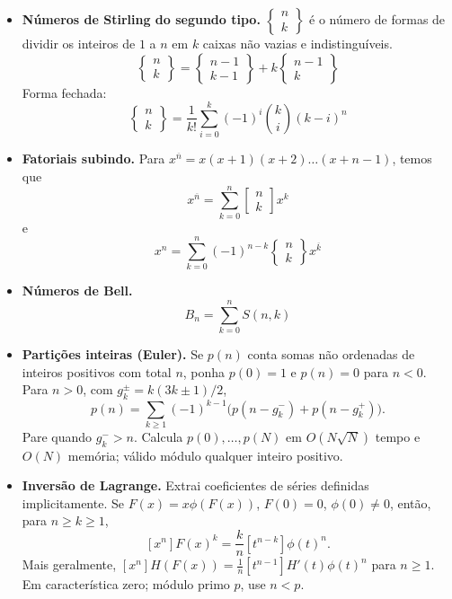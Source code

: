 \begin{itemize}[leftmargin=*,label={}]
	\item \textbf{Números de Stirling do segundo tipo.}
		$\begin{Bmatrix} n \\ k \end{Bmatrix}$ é o número de formas de dividir os inteiros de $1$ a $n$ em $k$ caixas não vazias e indistinguíveis.
		\[
			\begin{Bmatrix} n \\ k \end{Bmatrix} = \begin{Bmatrix} n-1 \\ k-1 \end{Bmatrix} + k \begin{Bmatrix} n-1 \\ k \end{Bmatrix}
		\]
		Forma fechada:
		\[
			\begin{Bmatrix} n \\ k \end{Bmatrix} = \frac1{k!}\sum_{i=0}^{k}(-1)^i\binom{k}{i}(k-i)^n
		\]

	\item \textbf{Fatoriais subindo.}
		Para $x^{\overline{n}} = x (x + 1) (x + 2) \dots (x + n - 1)$, temos que 
		\[
			x^{\overline{n}} = \sum\limits_{k = 0}^n \begin{bmatrix} n \\ k \end{bmatrix} x^k
		\]
		e
		\[
			x^n = \sum\limits_{k = 0}^n (-1)^{n - k} \begin{Bmatrix} n \\ k \end{Bmatrix} x^{\overline{k}}
		\]

	\ifextended
	\item \textbf{Números de Bell.}
		\[
			B_n=\sum_{k=0}^{n}S(n,k)
		\]
	\fi

\item \textbf{Partições inteiras (Euler).}
Se $p(n)$ conta somas não ordenadas de inteiros positivos com total $n$, ponha $p(0)=1$ e $p(n)=0$ para $n<0$. Para $n>0$, com $g_k^{\pm}=k(3k\pm1)/2$,
\[
p(n)=\sum_{k\ge1}(-1)^{k-1}\bigl(p(n-g_k^-)+p(n-g_k^+)\bigr).
\]
Pare quando $g_k^->n$. Calcula $p(0),\ldots,p(N)$ em $O(N\sqrt N)$ tempo e $O(N)$ memória; válido módulo qualquer inteiro positivo.

\item \textbf{Inversão de Lagrange.}
Extrai coeficientes de séries definidas implicitamente. Se $F(x)=x\phi(F(x))$, $F(0)=0$, $\phi(0)\ne0$, então, para $n\ge k\ge1$,
\[
[x^n]F(x)^k=\frac{k}{n}[t^{n-k}]\phi(t)^n.
\]
Mais geralmente, $[x^n]H(F(x))=\frac1n[t^{n-1}]H'(t)\phi(t)^n$ para $n\ge1$. Em característica zero; módulo primo $p$, use $n<p$.

\end{itemize}

